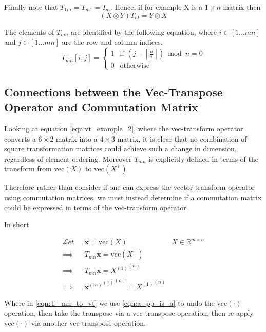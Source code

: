 \documentclass[10pt,fleqn]{article}
\newcommand \vecf[1] {
    \text{vec}\left(#1\right)
}
\newcommand \T { ^\top }
\newcommand \vv[1] { \bm #1 }
\newcommand \MReal[2] { { \mathbb{R}^{#1 \times #2} } }
\providecommand \ceil [1] { \left \lceil #1 \right \rceil }
\newcommand \vt[2] { { #1^{(#2)} } }
\begin{document}
\begin{appendices}
Finally note that $T_{1m} = T_{m1} = I_m$. Hence, if for example X is a $1 \times n$ matrix then
\begin{equation}
(X \otimes Y)T_{nl} = Y \otimes X
\end{equation}

The elements of $T_{mn}$ are identified by the following equation, where $i \in [1\ldots mn]$ and $j \in [1 \ldots mn]$ are the row and column indices.
\begin{equation}
T_{mn}[i,j] = 
\left\{
    \begin{array}{lr}
    1 & \text{if }  \left(j - \ceil{\frac{n}{i}}\right) \bmod n = 0 \\
    0 & \text{otherwise}
    \end{array}
\right.
\end{equation}


\subsection{Connections between the Vec-Transpose Operator and Commutation Matrix}
Looking at equation \eqref{eqn:vt_example_2}, where the vec-transform operator converts a $6 \times 2$ matrix into a $4 \times 3$ matrix, it is clear that no combination of square transformation matrices could achieve such a change in dimension, regardless of element ordering. Moreover $T_{mn}$ is explicitly defined in terms of the transform from $\vecf{X}$ to $\vecf{X\T}$

Therefore rather than consider if one can express the vector-transform operator using commutation matrices, we must instead determine if a commutation matrix could be expressed in terms of the vec-transform operator.

In short

\begin{align}
\mathcal{L}et\text{ } & \vv{x} = \vecf{X} & X \in \MReal{m}{n}\\
\implies & T_{mn} \vv{x} = \vecf{X\T} \\
\implies & T_{mn} \vv{x} = \vt{\vt{X}{1}}{n} \\
\implies &\vt{\vt{\vt{\vv{x}}{m}}{1}}{n} = \vt{\vt{X}{1}}{n} \label{eqn:T_mn_to_vt}
\end{align}

Where in \eqref{eqn:T_mn_to_vt} we use \eqref{eqn:a_pp_is_a} to undo the $\vecf{\cdot}$ operation, then take the transpose via a vec-transpose operation, then re-apply $\vecf{\cdot}$ via another vec-transpose operation.


\end{appendices}
\end{document}
